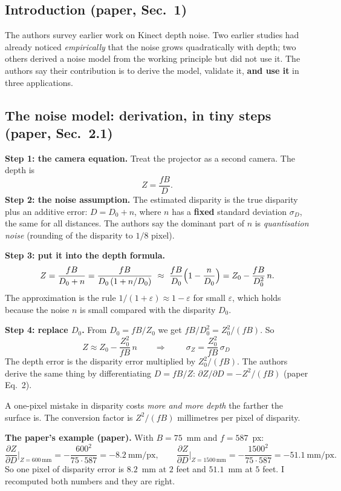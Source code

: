 \documentclass[11pt,a4paper]{article}
\begin{document}
\subsection{Introduction (paper, Sec.~1)}
The authors survey earlier work on Kinect depth noise. Two earlier studies had already noticed
\emph{empirically} that the noise grows quadratically with depth; two others derived a noise model
from the working principle but did not use it. The authors say their contribution is to derive the
model, validate it, \textbf{and use it} in three applications.

\subsection{The noise model: derivation, in tiny steps (paper, Sec.~2.1)}
\label{sec:derivation}
\textbf{Step 1: the camera equation.} Treat the projector as a second camera. The depth is
\[
Z=\frac{fB}{D}. \tag{paper: $D=fB/Z$}
\]
\textbf{Step 2: the noise assumption.} The estimated disparity is the true disparity plus an
additive error: $D = D_0 + n$, where $n$ has a \textbf{fixed} standard deviation $\sigma_D$, the
same for all distances. The authors say the dominant part of $n$ is \emph{quantisation noise}
(rounding of the disparity to $1/8$ pixel).

\textbf{Step 3: put it into the depth formula.}
\[
Z=\frac{fB}{D_0+n}=\frac{fB}{D_0\,(1+n/D_0)}\ \approx\ \frac{fB}{D_0}\Bigl(1-\frac{n}{D_0}\Bigr)
= Z_0-\frac{fB}{D_0^{2}}\,n .
\]
The approximation is the rule $1/(1+\varepsilon)\approx 1-\varepsilon$ for small $\varepsilon$, which
holds because the noise $n$ is small compared with the disparity $D_0$.

\textbf{Step 4: replace $D_0$.} From $D_0=fB/Z_0$ we get $fB/D_0^{2}=Z_0^{2}/(fB)$. So
\[
Z\approx Z_0-\frac{Z_0^{2}}{fB}\,n
\qquad\Longrightarrow\qquad
\boxed{\ \sigma_Z=\frac{Z_0^{2}}{fB}\,\sigma_D\ } \tag{paper Eq.~1}
\]
The depth error is the disparity error multiplied by $Z_0^2/(fB)$. The authors derive the same
thing by differentiating $D=fB/Z$: $\partial Z/\partial D=-Z^{2}/(fB)$ (paper Eq.~2).

\begin{eqbox}
A one-pixel mistake in disparity costs \emph{more and more depth} the farther the surface is. The
conversion factor is $Z^2/(fB)$ millimetres per pixel of disparity.
\end{eqbox}

\textbf{The paper's example (paper).} With $B=75$~mm and $f=587$~px:
\[
\frac{\partial Z}{\partial D}\Big|_{Z=600\,\mathrm{mm}}=-\frac{600^2}{75\cdot587}=-8.2\ \text{mm/px},\qquad
\frac{\partial Z}{\partial D}\Big|_{Z=1500\,\mathrm{mm}}=-\frac{1500^2}{75\cdot587}=-51.1\ \text{mm/px}.
\]
So one pixel of disparity error is $8.2$~mm at $2$ feet and $51.1$~mm at $5$ feet. I recomputed
both numbers and they are right.
\end{document}
